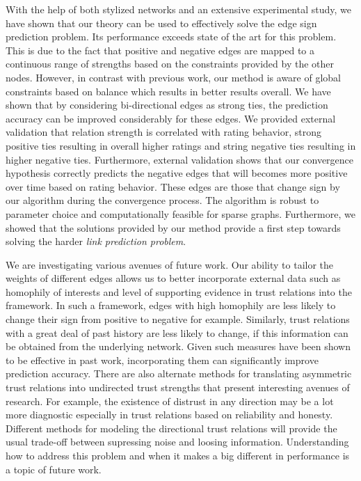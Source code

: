 \documentclass[acmtweb]{acmsmall}
\begin{document}
With the help of both stylized networks and an extensive experimental
study, we have shown that our theory can be used to effectively solve
the edge sign prediction problem. Its performance exceeds state of the
art for this problem. This is due to the fact that positive and
negative edges are mapped to a continuous range of strengths based on
the constraints provided by the other nodes. However, in contrast with
previous work, our method is aware of global constraints based on
balance which results in better results overall. We have shown that by
considering bi-directional edges as strong ties, the prediction
accuracy can be improved considerably for these edges. We provided
external validation that relation strength is correlated with rating
behavior, strong positive ties resulting in overall higher ratings and
string negative ties resulting in higher negative ties. Furthermore,
external validation shows that our convergence hypothesis correctly
predicts the negative edges that will becomes more positive over time
based on rating behavior. These edges are those that change sign by
our algorithm during the convergence process.  The algorithm is robust
to parameter choice and computationally feasible for sparse
graphs. Furthermore, we showed that the solutions provided by our
method provide a first step towards solving the harder {\it link
  prediction problem}.

We are investigating various avenues of future work. Our ability to
tailor the weights of different edges allows us to better incorporate
external data such as homophily of interests and level of supporting
evidence in trust relations into the framework. In such a framework,
edges with high homophily are less likely to change their sign from
positive to negative for example. Similarly, trust relations with a
great deal of past history are less likely to change, if this
information can be obtained from the underlying network.  Given such
measures have been shown to be effective in past work, incorporating
them can significantly improve prediction accuracy. There are also
alternate methods for translating asymmetric trust relations into
undirected trust strengths that present interesting avenues of
research. For example, the existence of distrust in any direction may be a
lot more diagnostic especially in trust relations based on reliability
and honesty. Different methods for modeling the directional trust
relations will provide the usual trade-off between supressing noise
and loosing information. Understanding how to address this problem and
when it makes a big different in performance is a topic of future
work.
\end{document}
